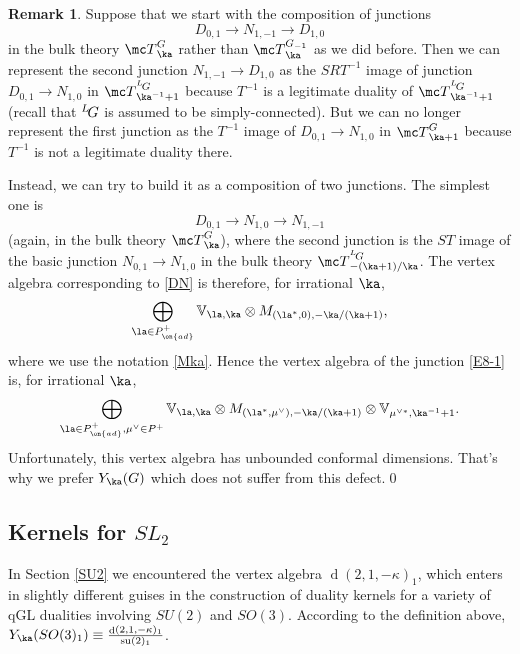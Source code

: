 \documentclass[11pt,reqno]{amsart}
\theoremstyle{plain}
\numberwithin{equation}{section}
\def\neg{\negthinspace}
\def\LG{{}^L\neg G}
\DeclareMathOperator{\td}{d}
\DeclareMathOperator{\tsu}{su}
\theoremstyle{definition}
\newtheorem{rem}{Remark}[section]
\begin{document}
\begin{rem}
Suppose that we start with the composition of junctions
\begin{equation}    \label{E8-1}
D_{0,1} \to N_{1,-1} \to D_{1,0}
\end{equation}
in the bulk theory ${\mc T}^G_{\ka}$ rather than ${\mc
  T}^{G_{-1}}_{\ka}$ as we did before. Then we can represent the
second junction $N_{1,-1} \to D_{1,0}$ as the $SRT^{-1}$ image of
junction $D_{0,1} \to N_{1,0}$ in ${\mc T}^{\LG}_{\ka^{-1}+1}$
because $T^{-1}$ is a legitimate duality of ${\mc
  T}^{\LG}_{\ka^{-1}+1}$ (recall that $\LG$ is assumed to be
simply-connected). But we can no longer represent the first junction
as the $T^{-1}$ image of $D_{0,1} \to N_{1,0}$ in ${\mc T}^G_{\ka+1}$
because $T^{-1}$ is not a legitimate duality there.

Instead, we can try to build it as a composition of two junctions. The
simplest one is
\begin{equation}    \label{DN}
D_{0,1} \to N_{1,0} \to N_{1,-1}
\end{equation}
(again, in the bulk theory ${\mc T}^G_\ka$), where the second junction
is the $ST$ image of the basic junction $N_{0,1} \to N_{1,0}$ in the
bulk theory ${\mc T}^{\LG}_{-(\ka+1)/\ka}$. The vertex algebra
corresponding to \eqref{DN} is therefore, for irrational $\ka$,
$$
\bigoplus_{\la \in P^+_{\on{ad}}} {\mathbb V}_{\la,\ka} \otimes
M_{(\la^*,0),-\ka/(\ka+1)},
$$
where we use the notation \eqref{Mka}. Hence the vertex algebra of the
junction \eqref{E8-1} is, for irrational $\ka$,
\begin{equation}    \label{tildeYka}
\bigoplus_{\la \in P^+_{\on{ad}},\mu^\vee \in P^+}
{\mathbb V}_{\la,\ka} \otimes M_{(\la^*,\mu^\vee),-\ka/(\ka+1)}
\otimes {\mathbb V}_{\mu^{\vee *},\ka^{-1}+1}.
\end{equation}
Unfortunately, this vertex algebra has unbounded conformal
dimensions. That's why we prefer $Y_\ka(G)$ which does not suffer
from this defect.\qed
\end{rem}

\subsection{Kernels for $SL_2$}

In Section \ref{SU2} we encountered the vertex algebra
$\td(2,1,-\kappa)_1$, which enters in slightly different guises in the
construction of duality kernels for a variety of qGL dualities
involving $SU(2)$ and $SO(3)$. According to the definition above, 
$Y_\ka(SO(3)_{1}) \equiv \frac{\td(2,1,-\kappa)_1}{\tsu(2)_1}$.
\end{document}
